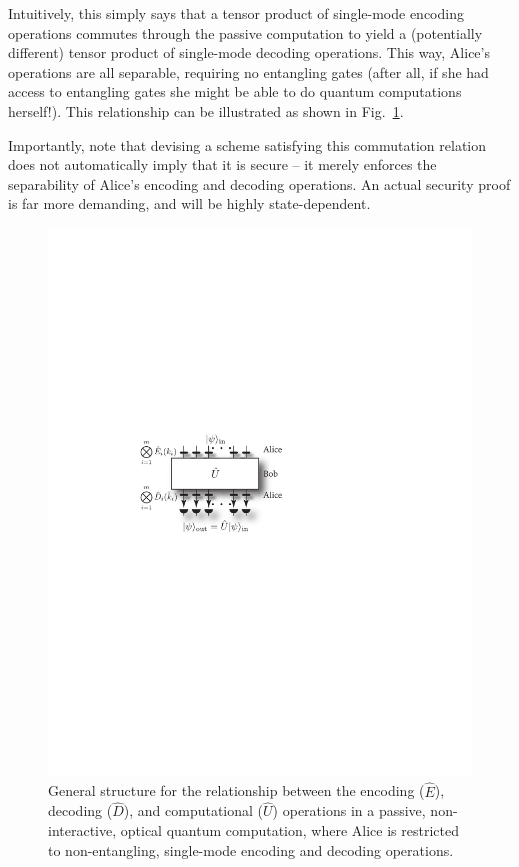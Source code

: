 \documentclass[aps,rmp,twocolumn,amsmath,amssymb,nofootinbib,superscriptaddress,longbibliography,floatfix,table-of-contents,eqsecnum]{revtex4-1}
\begin{document}
Intuitively, this simply says that a tensor product of single-mode encoding operations commutes through the passive computation to yield a (potentially different) tensor product of single-mode decoding operations. This way, Alice's operations are all separable, requiring no entangling gates (after all, if she had access to entangling gates she might be able to do quantum computations herself!). This relationship can be illustrated as shown in Fig.~\ref{fig:gen_pass_hom}.

Importantly, note that devising a scheme satisfying this commutation relation does not automatically imply that it is secure -- it merely enforces the separability of Alice's encoding and decoding operations. An actual security proof is far more demanding, and will be highly state-dependent.

\begin{figure}[!htb]
\includegraphics[width=0.85\columnwidth]{gen_pass_hom}
\caption{General structure for the relationship between the encoding ($\hat{E}$), decoding ($\hat{D}$), and computational ($\hat{U}$) operations in a passive, non-interactive, optical quantum computation, where Alice is restricted to non-entangling, single-mode encoding and decoding operations.} \label{fig:gen_pass_hom}
\end{figure}
\end{document}
